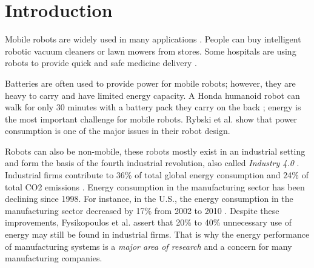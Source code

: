 \section{Introduction}
\label{sec:intro}

Mobile robots are widely used in many applications \cite{mei2005energy_consumers_identified}.
People can buy intelligent robotic vacuum cleaners or lawn mowers from stores. 
Some hospitals are using robots to provide quick and safe medicine delivery \cite{evans1994courier_hospital}.

Batteries are often used to provide power for mobile robots; however, they are heavy to carry and have limited energy capacity. 
A Honda humanoid robot can walk for only 30 minutes with a battery pack they carry on the back \cite{aylett2002machines_to_life}; energy is the most important challenge for mobile robots. 
Rybski et al. \cite{rybsky2000robot_rangers} show that power consumption is one of the major issues in their robot design.

Robots can also be non-mobile, these robots mostly exist in an industrial setting and form the basis of the fourth industrial revolution,
also called \textit{Industry 4.0} \cite{lasi2014industry4}. 
Industrial firms contribute to 36\% of total global energy consumption and 24\% of total CO2 emissions \cite{international2006energy}.
Energy consumption in the manufacturing sector has been declining since 1998. 
For instance, in the U.S., the energy consumption in the manufacturing sector decreased by 17\% from 2002 to 2010 \cite{US2018energy_administration}.
Despite these improvements, Fysikopoulos et al. \cite{fysikopoulos2012automotive_energy_consumption} assert that 20\% to 40\% unnecessary use of energy may still be found in industrial firms. 
That is why the energy performance of manufacturing systems is a \textit{major area of research} and a concern for many manufacturing companies.

